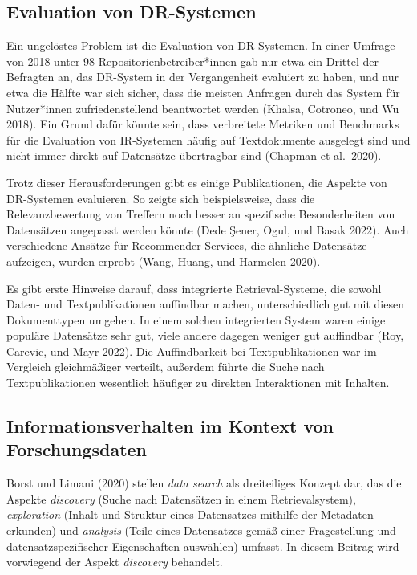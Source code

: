 \documentclass[a4paper,
fontsize=11pt,
oneside,
numbers=noperiodatend,
parskip=half-,
bibliography=totoc,
final
]{scrartcl}
\begin{document}
\hypertarget{evaluation-von-dr-systemen}{%
\subsection{Evaluation von
DR-Systemen}\label{evaluation-von-dr-systemen}}

Ein ungelöstes Problem ist die Evaluation von DR-Systemen. In einer
Umfrage von 2018 unter 98 Repositorienbetreiber*innen gab nur etwa ein
Drittel der Befragten an, das DR-System in der Vergangenheit evaluiert
zu haben, und nur etwa die Hälfte war sich sicher, dass die meisten
Anfragen durch das System für Nutzer*innen zufriedenstellend beantwortet
werden (Khalsa, Cotroneo, und Wu 2018). Ein Grund dafür könnte sein,
dass verbreitete Metriken und Benchmarks für die Evaluation von
IR-Systemen häufig auf Textdokumente ausgelegt sind und nicht immer
direkt auf Datensätze übertragbar sind (Chapman et al.~2020).

Trotz dieser Herausforderungen gibt es einige Publikationen, die Aspekte
von DR-Systemen evaluieren. So zeigte sich beispielsweise, dass die
Relevanzbewertung von Treffern noch besser an spezifische Besonderheiten
von Datensätzen angepasst werden könnte (Dede Şener, Ogul, und Basak
2022). Auch verschiedene Ansätze für Recommender-Services, die ähnliche
Datensätze aufzeigen, wurden erprobt (Wang, Huang, und Harmelen 2020).

Es gibt erste Hinweise darauf, dass integrierte Retrieval-Systeme, die
sowohl Daten- und Textpublikationen auffindbar machen, unterschiedlich
gut mit diesen Dokumenttypen umgehen. In einem solchen integrierten
System waren einige populäre Datensätze sehr gut, viele andere dagegen
weniger gut auffindbar (Roy, Carevic, und Mayr 2022). Die Auffindbarkeit
bei Textpublikationen war im Vergleich gleichmäßiger verteilt, außerdem
führte die Suche nach Textpublikationen wesentlich häufiger zu direkten
Interaktionen mit Inhalten.

\hypertarget{informationsverhalten-im-kontext-von-forschungsdaten}{%
\subsection{Informationsverhalten im Kontext von
Forschungsdaten}\label{informationsverhalten-im-kontext-von-forschungsdaten}}

Borst und Limani (2020) stellen \emph{data search} als dreiteiliges
Konzept dar, das die Aspekte \emph{discovery} (Suche nach Datensätzen in
einem Retrievalsystem), \emph{exploration} (Inhalt und Struktur eines
Datensatzes mithilfe der Metadaten erkunden) und \emph{analysis} (Teile
eines Datensatzes gemäß einer Fragestellung und datensatzspezifischer
Eigenschaften auswählen) umfasst. In diesem Beitrag wird vorwiegend der
Aspekt \emph{discovery} behandelt.\\
\end{document}
